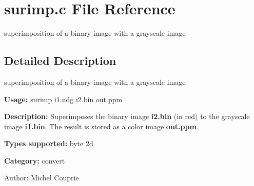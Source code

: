 \section{surimp.c File Reference}
\label{surimp_8c}
superimposition of a binary image with a grayscale image 



\subsection{Detailed Description}
superimposition of a binary image with a grayscale image 

{\bf Usage:} surimp i1.ndg i2.bin out.ppm

{\bf Description:} Superimposes the binary image {\bf i2.bin} (in red) to the grayscale image {\bf i1.bin}. The result is stored as a color image {\bf out.ppm}.

{\bf Types supported:} byte 2d

{\bf Category:} convert

\begin{Desc}
\item[Author:]Michel Couprie \end{Desc}
